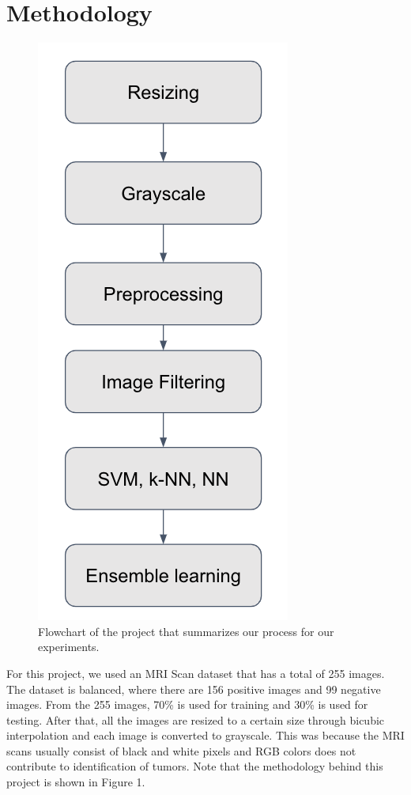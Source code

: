 \documentclass[conference]{IEEEtran}
\begin{document}
\section{Methodology}\label{method}
\begin{figure}[h]
\centering
\includegraphics[scale=0.4]{flowchart}
\caption{Flowchart of the project that summarizes our process for our experiments.}
\end{figure}

For this project, we used an MRI Scan dataset that has a total of 255 images. The dataset is balanced, where there are 156 positive images and 99 negative images. From the 255 images, 70\% is used for training and 30\% is used for testing. After that, all the images are resized to a certain size through bicubic interpolation and each image is converted to grayscale. This was because the MRI scans usually consist of black and white pixels and RGB colors does not contribute to identification of tumors. Note that the methodology behind this project is shown in Figure 1.
\end{document}
